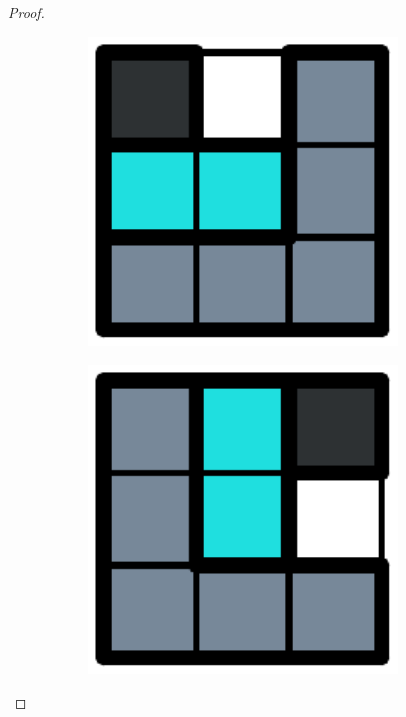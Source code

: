 \begin{proof}
\begin{figure}[h]
\begin{subfigure}[b]{0.1\textwidth}
    \caption{}
    \label{dom:turn2}
  \end{subfigure}
  \begin{subfigure}[b]{0.1\textwidth}
    \centering
    \includegraphics[width=0.9\textwidth]{pictures/dominoes/turns/turn_3.pdf}
    \caption{}
    \label{dom:turn3}
  \end{subfigure}
  \begin{subfigure}[b]{0.1\textwidth}
    \centering
    \includegraphics[width=0.9\textwidth]{pictures/dominoes/turns/turn_4.pdf}

\end{subfigure}
\end{figure}
\end{proof}
